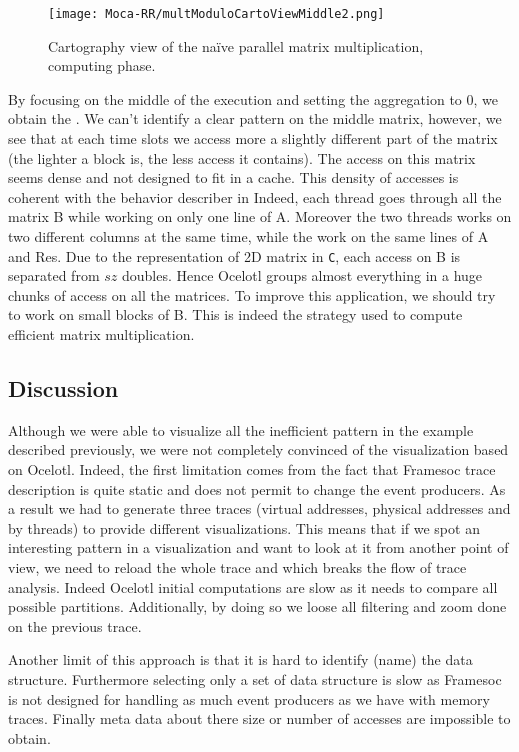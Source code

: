 \begin{figure}[htb]
    \centering
    \texttt{[image: Moca-RR/multModuloCartoViewMiddle2.png]}
    \caption{Cartography view of the naïve parallel matrix multiplication, computing phase.}
    \label{fig:ocelotl-Carto2}
\end{figure}

By focusing on the middle of the execution and setting the aggregation to $0$, we obtain the .
We can't identify a clear pattern on the middle matrix, however, we see that at each time slots we access more a slightly different part of the matrix (the lighter a block is, the less access it contains).
The access on this matrix seems  dense and not designed to fit in a cache.
This density of accesses is coherent with the behavior describer in 
Indeed, each thread goes through all the matrix B while working on only one line of A.
Moreover the two threads works on two different columns at the same time, while the work on the same lines of A and Res.
Due to the representation of 2D matrix in \texttt{C}, each access on B is separated from $sz$ doubles.
Hence \gls{Ocelotl} groups almost everything in a huge chunks of access on all the matrices.
To improve this application, we should try to work on small blocks of B.
This is indeed the strategy used to compute efficient matrix multiplication.

\subsection{Discussion}

Although we were able to visualize all the inefficient pattern in the example described previously, we were not completely convinced of the visualization based on \gls{Ocelotl}.
Indeed, the first limitation comes from the fact that \gls{Framesoc} trace description is quite static and does not permit to change the event producers.
As a result we had to generate three traces (virtual addresses, physical addresses and by threads) to provide different visualizations.
This means that if we spot an interesting pattern in a visualization and want to look at it from another point of view, we need to reload the whole trace and  which breaks the flow of trace analysis.
Indeed \gls{Ocelotl} initial computations are slow as it needs to compare all possible partitions.
Additionally, by doing so we loose all filtering and zoom done on the previous trace.

Another limit of this approach is that it is hard to identify (name) the data structure.
Furthermore selecting only a set of data structure is slow as \gls{Framesoc} is not designed for handling as much event producers as we have with memory traces.
Finally meta data about there size or number of accesses are impossible to obtain.

